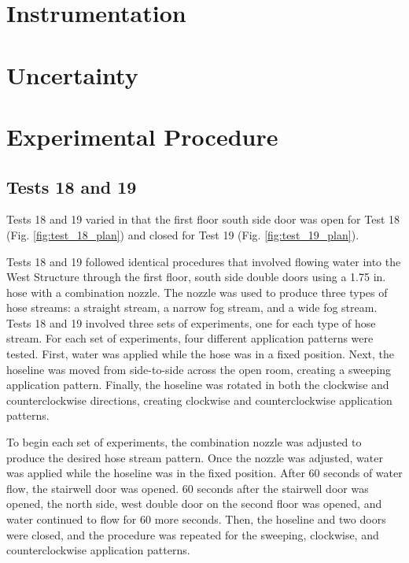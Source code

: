 \documentclass[12pt,oneside]{book}
\begin{document}
\section{Instrumentation}

\section{Uncertainty}

\section{Experimental Procedure}

\subsection{Tests 18 and 19}
Tests 18 and 19 varied in that the first floor south side door was open for Test 18 (Fig. \ref{fig:test_18_plan}) and closed for Test 19 (Fig. \ref{fig:test_19_plan}).

Tests 18 and 19 followed identical procedures that involved flowing water into the West Structure through the first floor, south side double doors using a 1.75 in. hose with a combination nozzle. The nozzle was used to produce three types of hose streams: a straight stream, a narrow fog stream, and a wide fog stream. Tests 18 and 19 involved three sets of experiments, one for each type of hose stream. For each set of experiments, four different application patterns were tested. First, water was applied while the hose was in a fixed position. Next, the hoseline was moved from side-to-side across the open room, creating a sweeping application pattern. Finally, the hoseline was rotated in both the clockwise and counterclockwise directions, creating clockwise and counterclockwise application patterns. 

To begin each set of experiments, the combination nozzle was adjusted to produce the desired hose stream pattern. Once the nozzle was adjusted, water was applied while the hoseline was in the fixed position. After 60 seconds of water flow, the stairwell door was opened. 60 seconds after the stairwell door was opened, the north side, west double door on the second floor was opened, and water continued to flow for 60 more seconds. Then, the hoseline and two doors were closed, and the procedure was repeated for the sweeping, clockwise, and counterclockwise application patterns.
\end{document}
